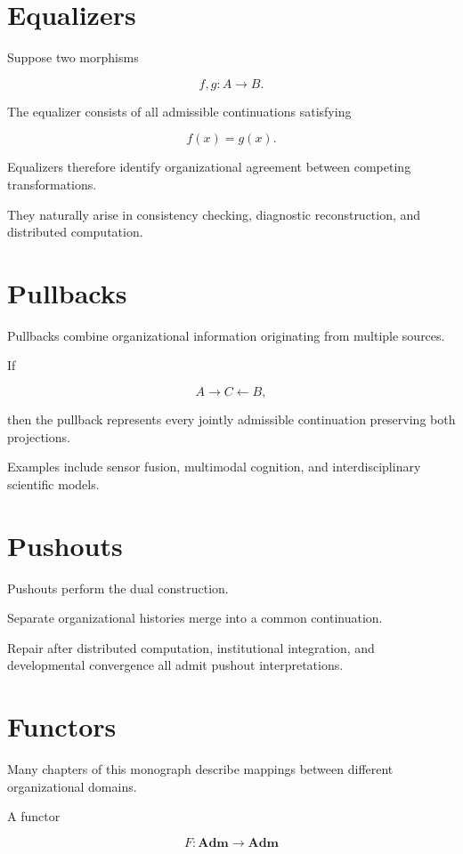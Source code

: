 \documentclass[11pt,oneside]{book}
\numberwithin{equation}{chapter}
\theoremstyle{definition}
\theoremstyle{plain}
\begin{document}
\section{Equalizers}

Suppose two morphisms

\[
f,g
:
A
\rightarrow
B.
\]

The equalizer consists of all admissible continuations satisfying

\[
f(x)
=
g(x).
\]

Equalizers therefore identify organizational agreement between competing
transformations.

They naturally arise in consistency checking, diagnostic reconstruction,
and distributed computation.

\section{Pullbacks}

Pullbacks combine organizational information originating from multiple
sources.

If

\[
A
\rightarrow
C
\leftarrow
B,
\]

then the pullback represents every jointly admissible continuation
preserving both projections.

Examples include sensor fusion, multimodal cognition, and
interdisciplinary scientific models.

\section{Pushouts}

Pushouts perform the dual construction.

Separate organizational histories merge into a common continuation.

Repair after distributed computation, institutional integration, and
developmental convergence all admit pushout interpretations.

\section{Functors}

Many chapters of this monograph describe mappings between different
organizational domains.

A functor

\[
F
:
\mathbf{Adm}
\rightarrow
\mathbf{Adm}
\]
\end{document}
